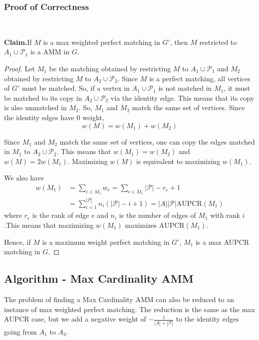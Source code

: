 \documentclass[letterpaper]{article} %
\newenvironment{claim}[1]{\par\noindent\textbf{Claim.}\space#1}{}
\begin{document}
\subsubsection{Proof of Correctness} ~\\
\begin{claim}
If $M$ is a max weighted perfect matching in $G'$, then $M$ restricted to $A_1 \cup \mathcal{P}_1$ is a AMM in $G$.
\end{claim}
\begin{proof}
Let $M_1$ be the matching obtained by restricting $M$ to $A_1 \cup \mathcal{P}_1$ and $M_2$ obtained by restricting $M$ to $A_2 \cup \mathcal{P}_2$. Since $M$ is a perfect matching, all vertices of $G'$ must be matched. So, if a vertex in $A_1 \cup \mathcal{P}_1$ is not matched in $M_1$, it must be matched to its copy in $A_2 \cup \mathcal{P}_2$ via the identity edge. This means that its copy is also unmatched in $M_2$. So, $M_1$ and $M_2$ match the same set of vertices.  Since the identity edges have 0 weight,
$$w(M) = w(M_1) + w(M_2)$$

Since $M_1$ and $M_2$ match the same set of vertices, one can copy the edges matched in $M_1$ to $A_2 \cup \mathcal{P}_2$. This means that $w(M_1) = w(M_2)$ and $w(M) = 2w(M_1)$. Maximizing $w(M)$ is equivalent to maximizing $w(M_1)$.

We also have
\begin{align*}\label{eq1}
w(M_1) & = \sum_{e \in M_1} w_e = \sum_{e \in M_1} |\mathcal{P}|-r_e+1 \\
& = \sum_{i=1}^{|\mathcal{P}|} n_i (|\mathcal{P}|-i+1) = |A||\mathcal{P}|\text{AUPCR}(M_1)
\end{align*}
where $r_e$ is the rank of edge $e$ and $n_i$ is the number of edges of $M_1$ with rank $i$.This means that maximizing $w(M_1)$ maximizes $\text{AUPCR}(M_1)$.

Hence, if $M$ is a maximum weight perfect matching in $G'$, $M_1$ is a max AUPCR matching in $G$.
\end{proof}

\subsection{Algorithm - Max Cardinality AMM}
The problem of finding a Max Cardinality AMM can also be reduced to an instance of max weighted perfect matching. The reduction is the same as the max AUPCR case, but we add a negative weight of $-\frac{1}{|A|+|\mathcal{P}|}$ to the identity edges going from $A_1$ to $A_2$.
\end{document}
